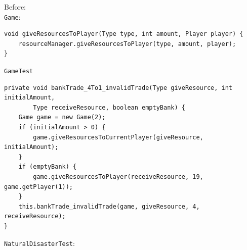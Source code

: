 \documentclass{fank1basedocument}
\begin{document}
Before:\\
\texttt{Game}:
\begin{lstlisting}[style=javacode,language=myJava]
void giveResourcesToPlayer(Type type, int amount, Player player) {
	resourceManager.giveResourcesToPlayer(type, amount, player);
}
\end{lstlisting}
\texttt{GameTest}
\begin{lstlisting}[style=javacode,language=myJava]
private void bankTrade_4To1_invalidTrade(Type giveResource, int initialAmount,
		Type receiveResource, boolean emptyBank) {
	Game game = new Game(2);
	if (initialAmount > 0) {
		game.giveResourcesToCurrentPlayer(giveResource, initialAmount);
	}
	if (emptyBank) {
		game.giveResourcesToPlayer(receiveResource, 19, game.getPlayer(1));
	}
	this.bankTrade_invalidTrade(game, giveResource, 4, receiveResource);
}
\end{lstlisting}
\texttt{NaturalDisasterTest}:
\end{document}
